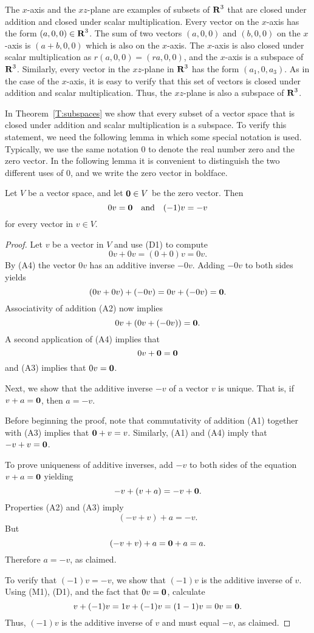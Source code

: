 \documentclass{ximera}
\begin{document}
The $x$-axis and the $xz$-plane are examples of subsets of $\mbox{$\bf{R}$}^3$
that are closed under addition and closed under scalar multiplication.
Every vector on the $x$-axis has the form $(a,0,0)\in\mbox{$\bf{R}$}^3$.
The sum of two vectors $(a,0,0)$ and $(b,0,0)$ on the $x$-axis is
$(a+b,0,0)$ which is also on the $x$-axis.  The $x$-axis
is also closed under scalar multiplication as $r(a,0,0)=(ra,0,0)$,
and the $x$-axis is a subspace of $\mbox{$\bf{R}$}^3$.  Similarly, every vector
in the $xz$-plane in $\mbox{$\bf{R}$}^3$ has the form $(a_1,0,a_3)$. As in the
case of the $x$-axis, it is easy to verify that this set of vectors
is closed under addition and scalar multiplication.  Thus, the
$xz$-plane is also a subspace of $\mbox{$\bf{R}$}^3$.

In Theorem~\ref{T:subspaces} we show that every subset of a vector space 
that is closed under addition and scalar multiplication is a subspace.  
To verify this statement, we need the following lemma in which some special 
notation is used.  Typically, we use the same notation $0$ to denote the
real number zero and the zero vector.  In the following
lemma it is convenient to distinguish the two different uses of $0$, and we 
write the zero vector in boldface.

\begin{lemma}  \label{lem:AddId}
Let $V$ be a vector space, and let ${\bf 0}\in V$ be the zero vector.  Then
\[
0v={\bf 0} \quad \mbox{and}\quad (-1)v=-v
\]
for every vector in $v\in V$.
\end{lemma}

\begin{proof} Let $v$ be a vector in $V$ and use (D1) to compute
\[
     0v + 0v  = (0+0)v = 0v.
\]
By (A4) the vector $0v$ has an additive inverse $-0v$.  Adding $-0v$ 
to both sides yields 
\[
(0v + 0v) + (-0v) = 0v + (-0v) = {\bf 0}.
\] 
Associativity of addition (A2) now implies 
\[
0v + (0v + (-0v)) = {\bf 0}.
\]
A second application of (A4) implies that 
\[
0v + {\bf 0} = {\bf 0}
\]
and (A3) implies that $0v={\bf 0}$.

Next, we show that the additive inverse $-v$ of a vector $v$ is unique. 
That is, if $v + a = {\bf 0}$, then $a=-v$.  

Before beginning the proof, note that commutativity of addition (A1) together 
with (A3) implies that ${\bf 0}+v=v$.  Similarly, (A1) and (A4) imply that 
$-v+v={\bf 0}$.  

To prove uniqueness of additive inverses, add $-v$ to both sides of the 
equation $v + a = {\bf 0}$ yielding 
\[
-v + (v + a) = -v + {\bf 0}. 
\]
Properties (A2) and (A3) imply
\[
(-v + v) + a = -v.
\]
But 
\[
(-v + v) + a = {\bf 0} + a = a.
\]
Therefore $a = -v$, as claimed.

To verify that $(-1)v = -v$, we show that $(-1)v$ is the
additive inverse of $v$.  Using (M1), (D1), and the fact that $0v = {\bf 0}$, 
calculate
\[
     v + (-1)v = 1v + (-1)v =(1-1)v = 0v = {\bf 0}.
\]
Thus, $(-1)v$ is the additive inverse of $v$ and must equal $-v$, as
claimed.  \end{proof}
\end{document}
